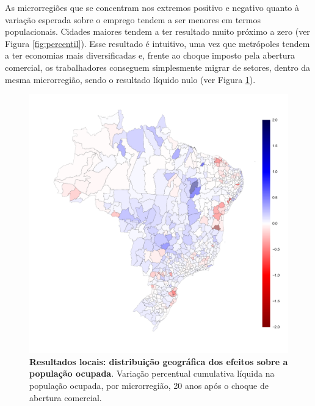 \documentclass{article}
\begin{document}
As microrregiões que se concentram nos extremos positivo e negativo quanto à variação esperada sobre o emprego tendem a ser menores em termos populacionais. Cidades maiores tendem a ter resultado muito próximo a zero (ver Figura \ref{fig:percentil}). Esse resultado é intuitivo, uma vez que metrópoles tendem a ter economias mais diversificadas e, frente ao choque imposto pela abertura comercial, os trabalhadores conseguem simplesmente migrar de setores, dentro da mesma microrregião, sendo o resultado líquido nulo (ver Figura \ref{fig:mapa_micro}).

\newpage
\begin{figure}[htbp!]
    \centering
    \includegraphics[scale=0.68]{mapa_micro.pdf}
    \caption[Resultados locais: distribuição geográfica dos efeitos sobre a população ocupada]{\textbf{Resultados locais: distribuição geográfica dos efeitos sobre a população ocupada}. Variação percentual cumulativa líquida na população ocupada, por microrregião, 20 anos após o choque de abertura comercial. }
    \label{fig:mapa_micro}
\end{figure}
\newpage
\end{document}
